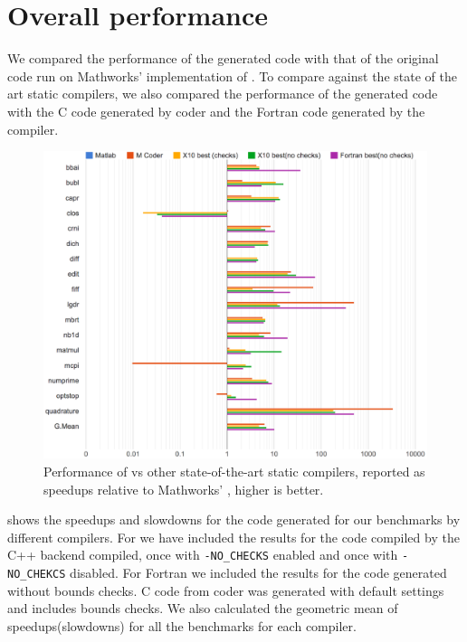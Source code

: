 \section{Overall \mixten performance}

We compared the performance of the generated \xten code with that of the
original \matlab code run on Mathworks' implementation of \matlab.  To compare
against the state of the art static compilers, we also compared the performance
of the \mixten generated \xten code with the C code generated by \matlab coder
and the Fortran code generated by the \mctwofor compiler.

\begin{figure}[htbp] 
\begin{center}
\includegraphics[width=\linewidth]{Figures/final/overall_perf.pdf}
\caption{Performance of \mixten vs other state-of-the-art static
compilers, reported as speedups relative to Mathworks' \matlab,  higher
is better.} \label{Fig:overall_perf} 
\end{center} 
\end{figure} 

 shows the speedups and slowdowns for the code
generated for our benchmarks by different compilers.  For \mixten we have
included the results for the \xten code compiled by the \xten C++ backend
compiled, once with \texttt{-NO\_CHECKS} enabled and once with
\texttt{-NO\_CHEKCS} disabled.  For Fortran we included the results for the
code generated without bounds checks.  C code from \matlab coder was generated
with default settings and includes bounds checks. We also calculated the
geometric mean of speedups(slowdowns) for all the benchmarks for each compiler. 

